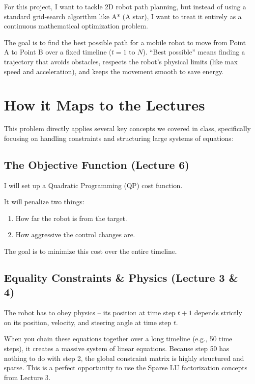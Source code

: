 \documentclass[12pt]{article}
\begin{document}
For this project, I want to tackle 2D robot path planning, but instead of using a standard grid-search algorithm like A* (A star), I want to treat it entirely as a continuous mathematical optimization problem.

The goal is to find the best possible path for a mobile robot to move from Point A to Point B over a fixed timeline ($t = 1$ to $N$). ``Best possible'' means finding a trajectory that avoids obstacles, respects the robot's physical limits (like max speed and acceleration), and keeps the movement smooth to save energy.

\section*{How it Maps to the Lectures}

This problem directly applies several key concepts we covered in class, specifically focusing on handling constraints and structuring large systems of equations:

\subsection*{The Objective Function (Lecture 6)}

I will set up a Quadratic Programming (QP) cost function.

It will penalize two things:
\begin{enumerate}
    \item How far the robot is from the target.
    \item How aggressive the control changes are.
\end{enumerate}

The goal is to minimize this cost over the entire timeline.

\subsection*{Equality Constraints \& Physics (Lecture 3 \& 4)}

The robot has to obey physics -- its position at time step $t+1$ depends strictly on its position, velocity, and steering angle at time step $t$.

When you chain these equations together over a long timeline (e.g., 50 time steps), it creates a massive system of linear equations. Because step 50 has nothing to do with step 2, the global constraint matrix is highly structured and sparse. This is a perfect opportunity to use the Sparse LU factorization concepts from Lecture 3.
\end{document}
